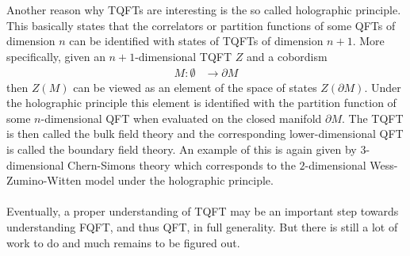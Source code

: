 \\\\
Another reason why TQFTs are interesting is the so called holographic principle. This basically states that the correlators or partition functions of some QFTs of dimension $n$ can be identified with states of TQFTs of dimension $n+1$. More specifically, given an $n+1$-dimensional TQFT $Z$ and a cobordism
\begin{align*}
  M
  \colon
  \emptyset
  &\to
  \partial M
\end{align*}
then $Z(M)$ can be viewed as an element of the space of states $Z(\partial M)$. Under the holographic principle this element is identified with the partition function of some $n$-dimensional QFT when evaluated on the closed manifold $\partial M$. The TQFT is then called the bulk field theory and the corresponding lower-dimensional QFT is called the boundary field theory. An example of this is again given by $3$-dimensional Chern-Simons theory which corresponds to the $2$-dimensional Wess-Zumino-Witten model under the holographic principle.
\\\\
Eventually, a proper understanding of TQFT may be an important step towards understanding FQFT, and thus QFT, in full generality. But there is still a lot of work to do and much remains to be figured out.
